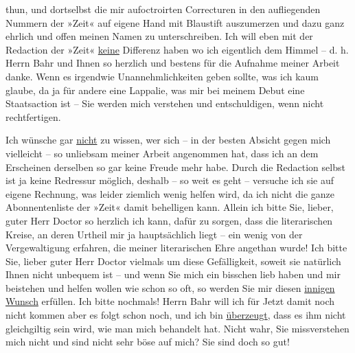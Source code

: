                thun, und dortselbst die mir aufoctroirten Correcturen in den aufliegenden Nummern
               der »Zeit« auf eigene Hand mit Blaustift
               auszumerzen und dazu {\pb}ganz ehrlich und offen meinen
               Namen zu unterschreiben. Ich will eben mit der Redaction der »Zeit« \uline{keine} Differenz haben
               wo ich eigentlich dem Himmel – d. h. Herrn Bahr und Ihnen so herzlich und bestens für die Aufnahme meiner Arbeit danke. Wenn es irgendwie
               Unannehmlichkeiten geben sollte, was ich kaum glaube, da ja für andere eine Lappalie,
               was mir bei meinem Debut eine Staatsaction ist – Sie werden mich verstehen und
               entschuldigen, wenn nicht rechtfertigen.\pend
           
\pstart
           {\pb}Ich wünsche gar \uline{nicht}
               zu wissen, wer sich – in der besten Absicht gegen mich vielleicht – so unliebsam
               meiner Arbeit angenommen hat, dass ich an dem Erscheinen derselben so gar keine
               Freude mehr habe. Durch die Redaction selbst ist ja keine Redressur möglich, deshalb
               – so weit es geht – versuche ich sie auf eigene Rechnung, was leider ziemlich wenig
               helfen wird, da ich nicht die ganze Abonnentenliste der »Zeit« damit behelligen kann. Allein ich bitte Sie, lieber,
               guter Herr Doctor so herzlich ich kann, dafür zu sorgen, dass die literarischen
               Kreise, an deren Urtheil {\pb}mir ja hauptsächlich liegt –
               ein wenig von der Vergewaltigung erfahren, die meiner literarischen Ehre angethan
               wurde! Ich bitte Sie, lieber guter Herr Doctor vielmals um diese Gefälligkeit, soweit
               sie natürlich Ihnen nicht unbequem ist – und wenn Sie mich ein bisschen lieb haben
               und mir beistehen und helfen wollen wie schon so oft, so werden Sie mir diesen \uline{innigen Wunsch} erfüllen. {\pb}Ich bitte nochmals! Herrn Bahr will ich für
               Jetzt damit noch nicht kommen aber es folgt schon noch, und ich bin \uline{überzeugt}, dass es ihm nicht gleichgiltig sein wird,
               wie man mich behandelt hat. Nicht wahr, Sie missverstehen mich nicht und sind nicht
               sehr böse auf mich? Sie sind doch so gut!\pend
           
